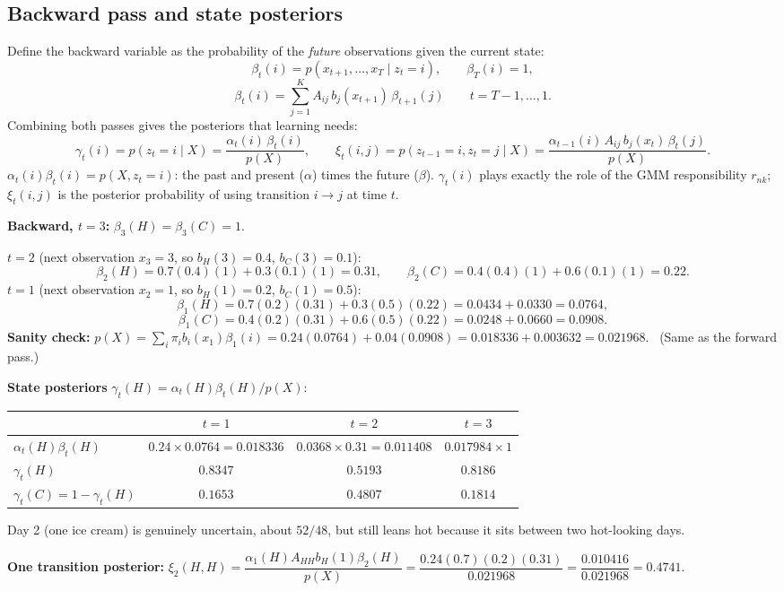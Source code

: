 \documentclass[11pt,a4paper]{article}
\begin{document}
\subsection{Backward pass and state posteriors}

Define the backward variable as the probability of the \emph{future} observations given the current state:
\[
\beta_t(i)=p(x_{t+1},\dots,x_T\mid z_t=i),\qquad\beta_T(i)=1,
\]
\[
\beta_t(i)=\sum_{j=1}^K A_{ij}\,b_j(x_{t+1})\,\beta_{t+1}(j)\qquad t=T-1,\dots,1.
\]
Combining both passes gives the posteriors that learning needs:
\[
\gamma_t(i)=p(z_t=i\mid X)=\frac{\alpha_t(i)\,\beta_t(i)}{p(X)},
\qquad
\xi_t(i,j)=p(z_{t-1}=i,z_t=j\mid X)=\frac{\alpha_{t-1}(i)\,A_{ij}\,b_j(x_t)\,\beta_t(j)}{p(X)}.
\]
$\alpha_t(i)\beta_t(i)=p(X,z_t=i)$: the past and present ($\alpha$) times the future ($\beta$). $\gamma_t(i)$ plays exactly the role of the GMM responsibility $r_{nk}$; $\xi_t(i,j)$ is the posterior probability of using transition $i\to j$ at time $t$.

\begin{example}[Example 5.2: Backward pass and posteriors for $X=(3,1,3)$]
\textbf{Backward, $t=3$:} $\beta_3(H)=\beta_3(C)=1$.

\textbf{$t=2$} (next observation $x_3=3$, so $b_H(3)=0.4$, $b_C(3)=0.1$):
\[
\beta_2(H)=0.7(0.4)(1)+0.3(0.1)(1)=0.31,\qquad \beta_2(C)=0.4(0.4)(1)+0.6(0.1)(1)=0.22.
\]
\textbf{$t=1$} (next observation $x_2=1$, so $b_H(1)=0.2$, $b_C(1)=0.5$):
\[
\beta_1(H)=0.7(0.2)(0.31)+0.3(0.5)(0.22)=0.0434+0.0330=0.0764,
\]
\[
\beta_1(C)=0.4(0.2)(0.31)+0.6(0.5)(0.22)=0.0248+0.0660=0.0908.
\]
\textbf{Sanity check:} $p(X)=\sum_i\pi_ib_i(x_1)\beta_1(i)=0.24(0.0764)+0.04(0.0908)=0.018336+0.003632=0.021968$. \checkmark\ (Same as the forward pass.)

\textbf{State posteriors} $\gamma_t(H)=\alpha_t(H)\beta_t(H)/p(X)$:
\begin{center}
\begin{tabular}{@{}lccc@{}}
\toprule
& $t=1$ & $t=2$ & $t=3$\\
\midrule
$\alpha_t(H)\beta_t(H)$ & $0.24\times0.0764=0.018336$ & $0.0368\times0.31=0.011408$ & $0.017984\times1$\\
$\gamma_t(H)$ & $0.8347$ & $0.5193$ & $0.8186$\\
$\gamma_t(C)=1-\gamma_t(H)$ & $0.1653$ & $0.4807$ & $0.1814$\\
\bottomrule
\end{tabular}
\end{center}
Day 2 (one ice cream) is genuinely uncertain, about $52/48$, but still leans hot because it sits between two hot-looking days.

\textbf{One transition posterior:}
$\xi_2(H,H)=\dfrac{\alpha_1(H)A_{HH}b_H(1)\beta_2(H)}{p(X)}=\dfrac{0.24(0.7)(0.2)(0.31)}{0.021968}=\dfrac{0.010416}{0.021968}=0.4741$.
\end{example}
\end{document}
